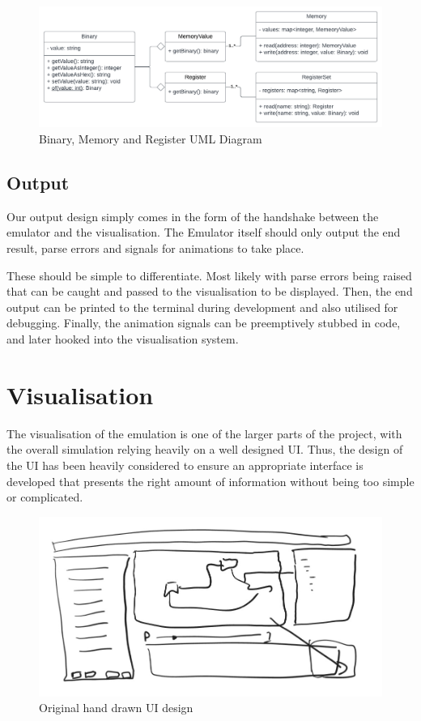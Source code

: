\begin{figure}[H]
    \centering
    \includegraphics[width=\linewidth]{dissertation/DATA/bin_regmem_uml.png}
    \caption{Binary, Memory and Register UML Diagram}
    \label{fig:bin_regmem_uml}
\end{figure}

\subsection{Output}
Our output design simply comes in the form of the handshake between the emulator and the visualisation. The Emulator itself should only output the end result, parse errors and signals for animations to take place.

These should be simple to differentiate. Most likely with parse errors being raised that can be caught and passed to the visualisation to be displayed. Then, the end output can be printed to the terminal during development and also utilised for debugging. Finally, the animation signals can be preemptively stubbed in code, and later hooked into the visualisation system.

\section{Visualisation}\label{sec:visualisation}
The visualisation of the emulation is one of the larger parts of the project, with the overall simulation relying heavily on a well designed \ac{UI}. Thus, the design of the \ac{UI} has been heavily considered to ensure an appropriate interface is developed that presents the right amount of information without being too simple or complicated.

\begin{figure}[H]
    \centering
    \includegraphics[width=\linewidth]{dissertation/DATA/early_design.jpg}
    \caption{Original hand drawn UI design}
    \label{fig:early_ui_design}
\end{figure}

